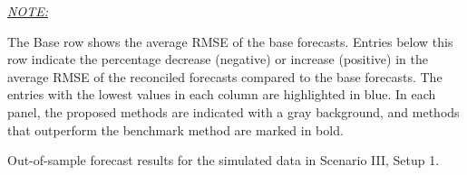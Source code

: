 \documentclass[11pt,a4paper,]{article}
\begin{document}
\begin{table}[!h]
{\begin{threeparttable}
\begin{tablenotes}[para]
\item \underline{\textit{NOTE:}} 
\item The Base row shows the average RMSE of the base forecasts. Entries below this row indicate the percentage decrease (negative) or increase (positive) in the average RMSE of the reconciled forecasts compared to the base forecasts. The entries with the lowest values in each column are highlighted in blue. In each panel, the proposed methods are indicated with a gray background, and methods that outperform the benchmark method are marked in bold.
\end{tablenotes}
\end{threeparttable}}
\end{table}

\hypertarget{tbl-s3-rmse}{}
\begin{table}[!h]
\caption{\label{tbl-s3-rmse}Out-of-sample forecast results for the simulated data in Scenario III,
Setup 1. }\tabularnewline


\end{table}
\end{document}
